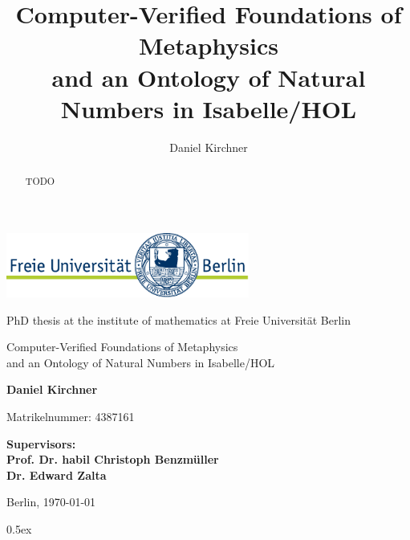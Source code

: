 \documentclass[a4paper,enabledeprecatedfontcommands,abstract=on,twoside=true,bibliography=totoc]{scrreprt}
\title{Computer-Verified Foundations of Metaphysics\\ and an Ontology of Natural Numbers in Isabelle/HOL}
\author{Daniel Kirchner}
\numberwithin{TODO}{chapter}
\numberwithin{equation}{section}
\begin{document}
\begin{titlepage}
\vspace{1cm}

\begin{center}
    \includegraphics[width=0.6\textwidth]{logo}
    \vspace{1cm}


PhD thesis at the institute of mathematics at Freie Universit\"at Berlin

    \vspace{2cm}


    \Large{\textsf{Computer-Verified Foundations of Metaphysics\\ and an Ontology of Natural Numbers in Isabelle/HOL}}

    \vspace{2cm}

    \large{\textbf{Daniel Kirchner}}

	\vspace{0.25cm}

	\small{Matrikelnummer: 4387161}

    \vspace{2cm}

    \large{\textbf{
        Supervisors:\\
Prof. Dr. habil Christoph Benzm\"uller\\
Dr. Edward Zalta
    }}

    \vspace{2cm}
    \large{Berlin, \today}
\end{center}
\end{titlepage}

\cleardoublepage

\begin{abstract}
TODO
\end{abstract}

\cleardoublepage

\tableofcontents

\cleardoublepage

\pagestyle{scrheadings}

\parindent 0pt\parskip 0.5ex



\end{document}

